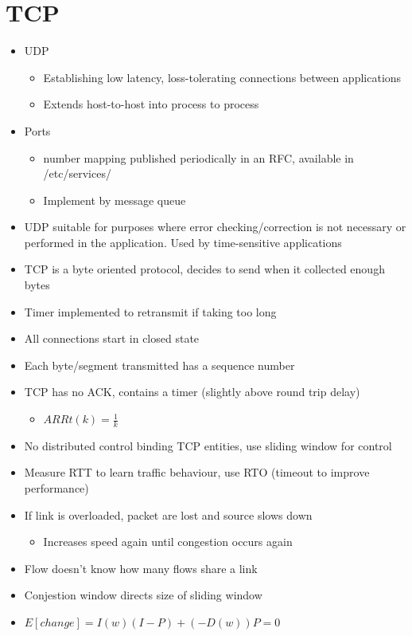 \documentclass{article}
\begin{document}
    \section{TCP}
    \begin{itemize}
        \item UDP
        \begin{itemize}
            \item Establishing low latency, loss-tolerating connections between applications
            \item Extends host-to-host into process to process
        \end{itemize}
        \item Ports
        \begin{itemize}
            \item number mapping published periodically in an RFC, available in /etc/services/
            \item Implement by message queue
        \end{itemize}
        \item UDP suitable for purposes where error checking/correction is not necessary or performed in the application. Used by time-sensitive applications
        \item TCP is a byte oriented protocol, decides to send when it collected enough bytes
        \item Timer implemented to retransmit if taking too long
        \item All connections start in closed state
        \item Each byte/segment transmitted has a sequence number
        \item TCP has no ACK, contains a timer (slightly above round trip delay)
        \begin{itemize}
            \item $ARRt(k)=\frac{1}{k}$
        \end{itemize}
        \item No distributed control binding TCP entities, use sliding window for control
        \item Measure RTT to learn traffic behaviour, use RTO (timeout to improve performance)
        \item If link is overloaded, packet are lost and source slows down
        \begin{itemize}
            \item Increases speed again until congestion occurs again
        \end{itemize}
        \item Flow doesn't know how many flows share a link
        \item Conjestion window directs size of sliding window
        \item $E[change]=I(w)(I-P)+(-D(w))P = 0$
    \end{itemize}
\end{document}
